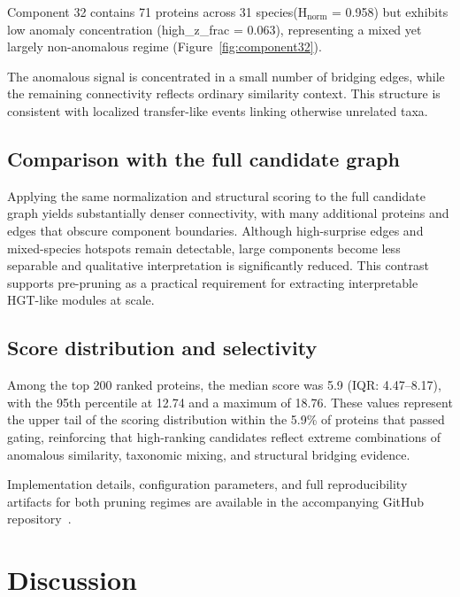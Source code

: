 \documentclass[11pt]{article}
\begin{document}
Component 32 contains 71 proteins across 31 species(H$_{\mathrm{norm}}$ = 0.958) but exhibits low anomaly concentration (high\_z\_frac = 0.063), representing a mixed yet largely non-anomalous regime (Figure~\ref{fig:component32}).

The anomalous signal is concentrated in a small number of bridging edges, while the remaining connectivity reflects ordinary similarity context. This structure is consistent with localized transfer-like events linking otherwise unrelated taxa.

\subsection{Comparison with the full candidate graph}

Applying the same normalization and structural scoring to the full candidate graph yields substantially denser connectivity, with many additional proteins and edges that obscure component boundaries. Although high-surprise edges and mixed-species hotspots remain detectable, large components become less separable and qualitative interpretation is significantly reduced. This contrast supports pre-pruning as a practical requirement for extracting interpretable HGT-like modules at scale.

\subsection{Score distribution and selectivity}

Among the top 200 ranked proteins, the median score was 5.9 (IQR: 4.47–8.17), with the 95th percentile at 12.74 and a maximum of 18.76. These values represent the upper tail of the scoring distribution within the 5.9\% of proteins that passed gating, reinforcing that high-ranking candidates reflect extreme combinations of anomalous similarity, taxonomic mixing,
and structural bridging evidence.

Implementation details, configuration parameters, and full reproducibility artifacts for both pruning regimes are available in the accompanying GitHub repository~\cite{HGTRepo2026}.

\FloatBarrier

\section{Discussion}
\label{sec:discussion}
\end{document}

